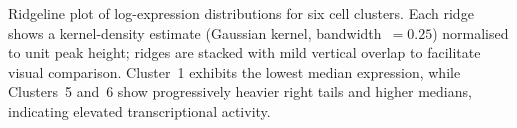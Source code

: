 \caption{Ridgeline plot of log-expression distributions for six cell clusters. Each ridge shows a kernel-density estimate (Gaussian kernel, bandwidth~$= 0.25$) normalised to unit peak height; ridges are stacked with mild vertical overlap to facilitate visual comparison. Cluster~1 exhibits the lowest median expression, while Clusters~5 and~6 show progressively heavier right tails and higher medians, indicating elevated transcriptional activity.}
